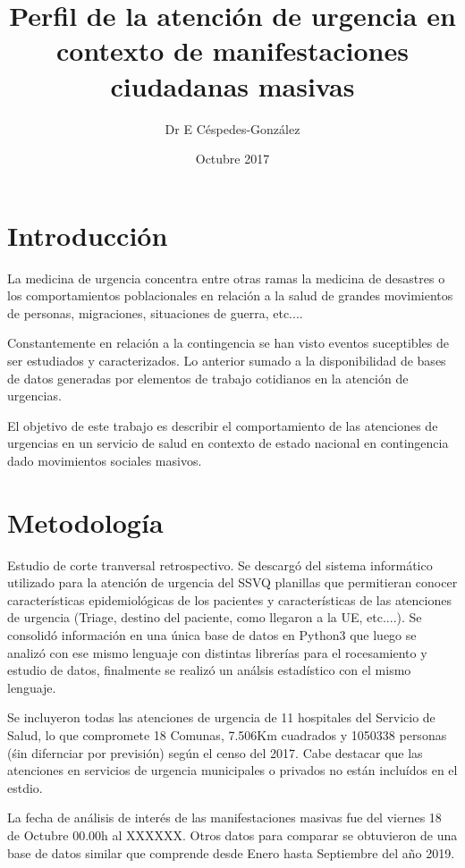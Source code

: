 \documentclass{article}
\title{Perfil de la atención de urgencia en contexto de manifestaciones ciudadanas masivas }
\author{Dr E Céspedes-González}
\date{Octubre 2017}
\begin{document}
\maketitle

\section{Introducción}

La medicina de urgencia concentra entre otras ramas la medicina de desastres o los comportamientos poblacionales en relación a la salud de grandes movimientos de personas, migraciones, situaciones de guerra, etc....


Constantemente en relación a la contingencia se han visto eventos suceptibles de ser estudiados y caracterizados. Lo anterior sumado a la disponibilidad de bases de datos generadas por elementos de trabajo cotidianos en la atención de urgencias.

El objetivo de este trabajo es describir el comportamiento de las atenciones de urgencias en un servicio de salud en contexto de estado nacional en contingencia dado movimientos sociales masivos.


\section{Metodología}
Estudio de corte tranversal retrospectivo. Se descargó del sistema informático utilizado para la atención de urgencia del SSVQ planillas que permitieran conocer características epidemiológicas de los pacientes y  características de las atenciones de urgencia (Triage, destino del paciente, como llegaron a la UE, etc....). Se consolidó información en una única base de datos en Python3 que luego se analizó con ese mismo lenguaje con distintas librerías para el rocesamiento y estudio de datos, finalmente se realizó un análsis estadístico con el mismo lenguaje.

Se incluyeron todas las atenciones de urgencia de 11 hospitales del Servicio de Salud, lo que compromete 18 Comunas, 7.506Km cuadrados y 1050338 personas (śin difernciar por previsión) según el censo del 2017. Cabe destacar que las atenciones en servicios de urgencia municipales o privados no están incluídos en el estdio.

La fecha de análisis de interés de las manifestaciones masivas fue del viernes 18 de Octubre 00.00h al XXXXXX. Otros datos para comparar se obtuvieron de una base de datos similar que comprende desde Enero hasta Septiembre del año 2019.
\end{document}
